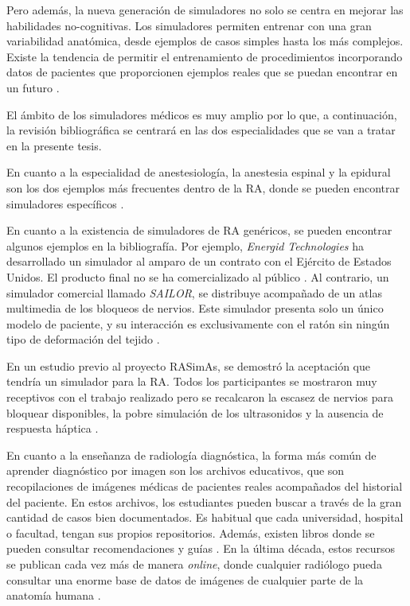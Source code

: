 Pero además, la nueva generación de simuladores no solo se centra en mejorar las habilidades no-cognitivas. Los simuladores permiten entrenar con una gran variabilidad anatómica, desde ejemplos de casos simples hasta los más complejos. Existe la tendencia de permitir el entrenamiento de procedimientos incorporando datos de pacientes que proporcionen ejemplos reales que se puedan encontrar en un futuro \cite{Willaert2012, ZHANG2017599}. 

El ámbito de los simuladores médicos es muy amplio por lo que, a continuación, la revisión bibliográfica se centrará en las dos especialidades que se van a tratar en la presente tesis.


En cuanto a la especialidad de anestesiología, la anestesia espinal y la epidural son los dos ejemplos más frecuentes dentro de la \ac{RA}, donde se pueden encontrar simuladores específicos \cite{broom2018evaluation}. %

En cuanto a la existencia de simuladores de \ac{RA} genéricos, se pueden encontrar algunos ejemplos en la bibliografía. Por ejemplo, \emph{Energid Technologies} ha desarrollado  un simulador al amparo de un contrato con el Ejército de Estados Unidos. El producto final no se ha comercializado al público \cite{lim2008simulation}. Al contrario, un simulador comercial llamado \emph{SAILOR}, se distribuye acompañado de un atlas multimedia de los bloqueos de nervios. Este simulador presenta solo un único modelo de paciente, y su interacción es exclusivamente con el ratón sin ningún tipo de deformación del tejido \cite{Bibin}. 

En un estudio previo al proyecto \ac{RASimAs}, se demostró la aceptación que tendría un simulador para la \ac{RA}. Todos los participantes se mostraron muy receptivos con el trabajo realizado pero se recalcaron la escasez de nervios para bloquear disponibles, la pobre simulación de los ultrasonidos y la ausencia de respuesta háptica \cite{Grottke2009594}.


En cuanto a la enseñanza de radiología diagnóstica, la forma más común de aprender diagnóstico por imagen son los archivos educativos, que son recopilaciones de imágenes médicas de pacientes reales acompañados del historial del paciente. En estos archivos, los estudiantes pueden buscar a través de la gran cantidad de casos bien documentados. Es habitual que cada universidad, hospital o facultad, tengan sus propios repositorios. Además, existen libros donde se pueden consultar recomendaciones y guías \cite{carver2012medical,manualpractico}. 
En la última década, estos recursos se publican cada vez más de manera \emph{online}, donde cualquier radiólogo pueda consultar una enorme base de datos de imágenes de cualquier parte de la anatomía humana \cite{deshpande2017integrated}. 


